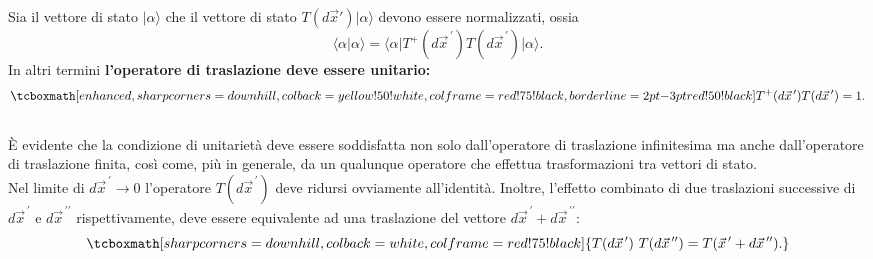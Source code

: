 \documentclass[a4paper,12pt,oneside]{book}
\begin{document}
Sia il vettore di stato $\vert \alpha \rangle$ che il vettore di stato $T(d\vec{x}') \vert \alpha \rangle$ devono essere normalizzati, ossia
	\begin{equation}
		\langle \alpha \vert \alpha \rangle = \langle \alpha \vert T^+(d{\vec{x}}^{\, \prime}) T(d{\vec{x}}^{\, \prime}) \vert \alpha \rangle .
	\end{equation}
In altri termini \textbf{l'operatore di traslazione deve essere unitario:}
	\begin{equation}
		\tcboxmath[enhanced,sharp corners=downhill ,colback=yellow!50!white,colframe=red!75!black, borderline={2pt}{-3pt}{red!50!black}]{
			T^+(d{\vec{x}}^{\, \prime}) T(d{\vec{x}}^{\, \prime}) =1 .
			}
	\end{equation}\\
	
È evidente che la condizione di unitarietà deve essere soddisfatta non solo dall'operatore di traslazione infinitesima ma anche dall'operatore di traslazione finita, così come, più in generale, da un qualunque operatore che effettua trasformazioni tra vettori di stato.\\

Nel limite di $d{\vec{x}}^{\, \prime} \rightarrow 0$ l'operatore $T(d{\vec{x}}^{\, \prime})$ deve ridursi ovviamente all'identità. Inoltre, l'effetto combinato di due traslazioni successive di $d{\vec{x}}^{\, \prime}$ e $d{\vec{x}}^{\, \prime \prime}$ rispettivamente, deve essere equivalente ad una traslazione del vettore $d{\vec{x}}^{\, \prime}+d{\vec{x}}^{\, \prime \prime}$: 
	\begin{equation}
		\tcboxmath[sharp corners=downhill ,colback=white,colframe=red!75!black]{
			T(d{\vec{x}}^{\, \prime})\ T(d{\vec{x}}^{\, \prime \prime}) = T({\vec{x}}^{\, \prime}+d{\vec{x}}^{\, \prime \prime}).
			}
	\end{equation}\\
	
\end{document}

